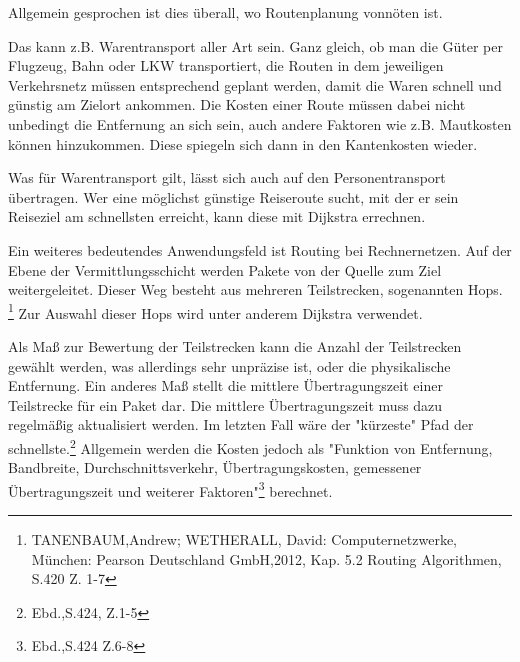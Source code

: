 \parindent0pt Allgemein gesprochen ist dies überall, wo Routenplanung vonnöten ist.

\parindent0pt
Das kann z.B. Warentransport aller Art sein. Ganz gleich, ob man die Güter per Flugzeug, Bahn oder LKW transportiert, die Routen in dem jeweiligen Verkehrsnetz müssen entsprechend geplant werden, damit die Waren schnell und günstig am Zielort ankommen. Die Kosten einer Route müssen dabei nicht unbedingt die Entfernung an sich sein, auch andere Faktoren wie z.B. Mautkosten können hinzukommen. Diese spiegeln sich dann in den Kantenkosten wieder.

\parindent0pt Was für Warentransport gilt, lässt sich auch auf den Personentransport übertragen. Wer eine möglichst günstige Reiseroute sucht, mit der er sein Reiseziel am schnellsten erreicht, kann diese mit Dijkstra errechnen.

\parindent0pt Ein weiteres bedeutendes Anwendungsfeld ist Routing bei Rechnernetzen. Auf der Ebene der Vermittlungsschicht werden Pakete von der Quelle zum Ziel weitergeleitet. Dieser Weg besteht aus mehreren Teilstrecken, sogenannten Hops. \footnote{TANENBAUM,Andrew; WETHERALL, David: Computernetzwerke, München: Pearson Deutschland GmbH,2012, Kap. 5.2 Routing Algorithmen, S.420 Z. 1-7} Zur Auswahl dieser Hops wird unter anderem Dijkstra verwendet. 

\parindent0pt
Als Maß zur Bewertung der Teilstrecken kann die Anzahl der Teilstrecken gewählt werden, was allerdings sehr unpräzise ist, oder die physikalische Entfernung. Ein anderes Maß stellt die mittlere Übertragungszeit einer Teilstrecke für ein Paket dar. Die mittlere Übertragungszeit muss dazu regelmäßig aktualisiert werden. Im letzten Fall wäre der "kürzeste" Pfad der schnellste.\footnote{Ebd.,S.424, Z.1-5}
Allgemein werden die Kosten jedoch als "Funktion von Entfernung, Bandbreite, Durchschnittsverkehr, Übertragungskosten, gemessener Übertragungszeit und weiterer Faktoren"\footnote{Ebd.,S.424 Z.6-8} berechnet.


